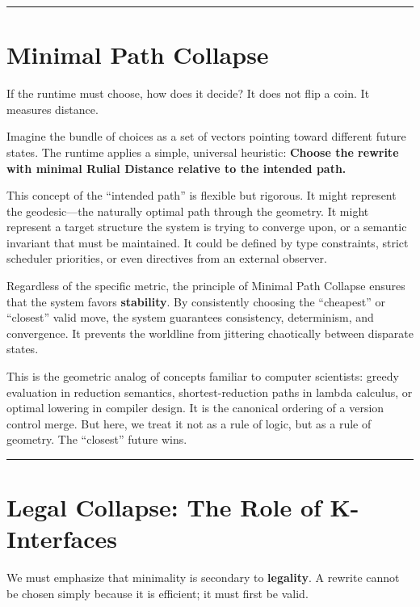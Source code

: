 \begin{center}\rule{0.5\linewidth}{0.5pt}\end{center}

\section{\texorpdfstring{\textbf{Minimal Path Collapse}}{13.3 --- Minimal Path Collapse}}

If the runtime must choose, how does it decide? It does not flip a coin. It measures distance.

Imagine the bundle of choices as a set of vectors pointing toward different future states. The runtime applies a simple, universal heuristic: \textbf{Choose the rewrite with minimal Rulial Distance relative to the intended path.}

This concept of the ``intended path'' is flexible but rigorous. It might represent the geodesic—the naturally optimal path through the geometry. It might represent a target structure the system is trying to converge upon, or a semantic invariant that must be maintained. It could be defined by type constraints, strict scheduler priorities, or even directives from an external observer.

Regardless of the specific metric, the principle of Minimal Path Collapse ensures that the system favors \textbf{stability}. By consistently choosing the ``cheapest'' or ``closest'' valid move, the system guarantees consistency, determinism, and convergence. It prevents the worldline from jittering chaotically between disparate states.

This is the geometric analog of concepts familiar to computer scientists: greedy evaluation in reduction semantics, shortest-reduction paths in lambda calculus, or optimal lowering in compiler design. It is the canonical ordering of a version control merge. But here, we treat it not as a rule of logic, but as a rule of geometry. The ``closest'' future wins.

\begin{center}\rule{0.5\linewidth}{0.5pt}\end{center}

\section{\texorpdfstring{\textbf{Legal Collapse: The Role of K-Interfaces}}{13.4 --- Legal Collapse: The Role of K-Interfaces}}

We must emphasize that minimality is secondary to \textbf{legality}. A rewrite cannot be chosen simply because it is efficient; it must first be valid.

